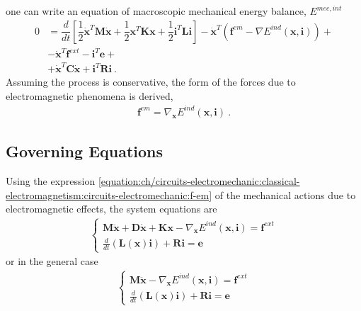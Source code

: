 \documentclass[letterpaper,10pt,english]{jupyterBook}
\begin{document}
\sphinxAtStartPar
one can write an equation of macroscopic mechanical energy balance, \(E^{mec, int}\)
\begin{equation*}
\begin{split}
0 & = \dfrac{d}{dt} \left[ \dfrac{1}{2} \dot{\mathbf{x}}^T \mathbf{M} \dot{\mathbf{x}} + \dfrac{1}{2} \mathbf{x}^T \mathbf{K} \mathbf{x} + \dfrac{1}{2} \mathbf{i}^T \mathbf{L} \mathbf{i} \right] - \dot{\mathbf{x}}^T \left( \mathbf{f}^{em} - \nabla E^{ind}(\mathbf{x}, \mathbf{i})  \right) + \\
  & - \dot{\mathbf{x}}^T \mathbf{f}^{ext} - \mathbf{i}^T \mathbf{e} + \\
  & + \dot{\mathbf{x}}^T \mathbf{C} \dot{\mathbf{x}} + \mathbf{i}^T \mathbf{R} \mathbf{i} \ .
\end{split}
\end{equation*}
\sphinxAtStartPar
Assuming the process is conservative, the form of the forces due to electromagnetic phenomena is derived,
\begin{equation}\label{equation:ch/circuits-electromechanic:classical-electromagnetism:circuits-electromechanic:f-em}
\begin{split}\mathbf{f}^{em} = \nabla_{\mathbf{x}} E^{ind}(\mathbf{x}, \mathbf{i}) \ .\end{split}
\end{equation}

\subsection{Governing Equations}
\label{\detokenize{ch/circuits-electromechanic:governing-equations}}
\sphinxAtStartPar
Using the expression \eqref{equation:ch/circuits-electromechanic:classical-electromagnetism:circuits-electromechanic:f-em} of the mechanical actions due to electromagnetic effects, the system equations are
\begin{equation*}
\begin{split}\begin{cases}
  \mathbf{M} \ddot{\mathbf{x}} + \mathbf{D} \dot{\mathbf{x}} + \mathbf{K} \mathbf{x} - \nabla_{\mathbf{x}} E^{ind}(\mathbf{x}, \mathbf{i})  = \mathbf{f}^{ext} \\
  \frac{d}{dt} \left( \mathbf{L}(\mathbf{x}) \mathbf{i} \right) + \mathbf{R} \mathbf{i} = \mathbf{e}
\end{cases}\end{split}
\end{equation*}
\sphinxAtStartPar
or in the general case
\begin{equation*}
\begin{split}\begin{cases}
  \mathbf{M} \ddot{\mathbf{x}} - \nabla_{\mathbf{x}} E^{ind} ( \mathbf{x}, \mathbf{i}) = \mathbf{f}^{ext} \\
  \frac{d}{dt} \left( \mathbf{L}(\mathbf{x}) \mathbf{i} \right) + \mathbf{R} \mathbf{i} = \mathbf{e}
\end{cases}\end{split}
\end{equation*}
\end{document}
